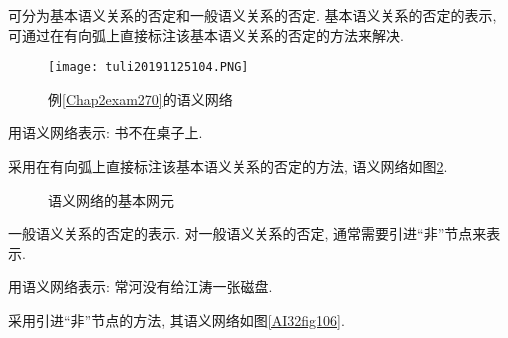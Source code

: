 可分为基本语义关系的否定和一般语义关系的否定. 基本语义关系的否定的表示, 可通过在有向弧上直接标注该基本语义关系的否定的方法来解决.
\begin{figure}[H]
\centering
\texttt{[image: tuli20191125104.PNG]}
\caption{例\ref{Chap2exam270}的语义网络}
\label{AI32fig104}
\end{figure}
\begin{example}
用语义网络表示: 书不在桌子上.
\end{example}
采用在有向弧上直接标注该基本语义关系的否定的方法, 语义网络如图\ref{AI32fig00105}.
\begin{figure}[H]
\begin{center}
\caption{语义网络的基本网元}
\label{AI32fig00105}
\end{center}
\end{figure}
一般语义关系的否定的表示. 对一般语义关系的否定, 通常需要引进“非”节点来表示.
\begin{example}\label{Chap2exam271}
用语义网络表示:  常河没有给江涛一张磁盘.
\end{example}
采用引进“非”节点的方法, 其语义网络如图\ref{AI32fig106}.
